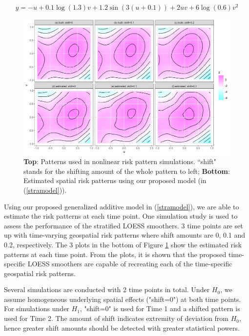 	\begin{equation}\label{eq:nlsim}
	y=-u + 0.1\log(1.3)v+1.2\sin(3(u+0.1))+2uv+ 6\log(0.6)v^2
	\end{equation}
	
	\begin{figure}[h]
		\centering
		\includegraphics[width=\linewidth]{Figures/Chap3/TrueNEst.png}
		\caption{\textbf{Top}: Patterns used in nonlinear risk pattern simulations. ``shift" stands for the shifting amount of the whole pattern to left; \textbf{Bottom}: Estimated spatial risk patterns using our proposed model (in (\ref{stramodel})).}
		\label{fig:1}
	\end{figure}
	
	Using our proposed generalized additive model in (\ref{stramodel}), we are able to estimate the risk patterns at each time point. One simulation study is used to assess the performance of the stratified LOESS smoothers. 3 time points are set up with time-varying geospatial risk patterns where shift amounts are 0, 0.1 and 0.2, respectively. The 3 plots in the bottom of Figure \ref{fig:1} show the estimated risk patterns at each time point. From the plots, it is shown that the proposed time-specific LOESS smoothers are capable of recreating each of the time-specific geospatial risk patterns.
	
	Several simulations are conducted with 2 time points in total. Under $H_0$, we assume homogeneous underlying spatial effects ("shift=0") at both time points.  For simulations under $H_1$, "shift=0" is used for Time 1 and a shifted pattern is used for Time 2. The amount of shift indicates extremity of deviation from $H_0$, hence greater shift amounts should be detected with greater statistical powers. 
	
